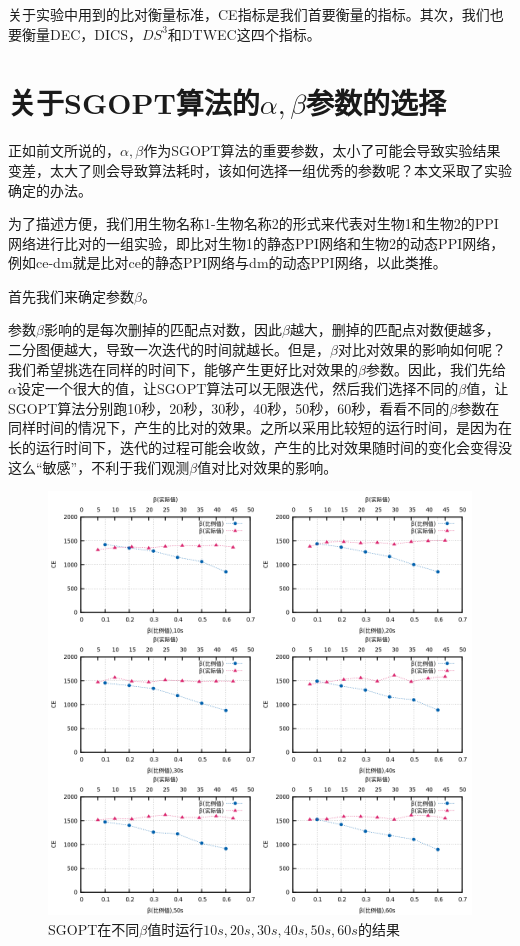 关于实验中用到的比对衡量标准，CE指标是我们首要衡量的指标。其次，我们也要衡量DEC，DICS，$DS^3$和DTWEC这四个指标。

\section{关于SGOPT算法的$\alpha,\beta$参数的选择}

正如前文所说的，$\alpha,\beta$作为SGOPT算法的重要参数，太小了可能会导致实验结果变差，太大了则会导致算法耗时，该如何选择一组优秀的参数呢？本文采取了实验确定的办法。

为了描述方便，我们用生物名称1-生物名称2的形式来代表对生物1和生物2的PPI网络进行比对的一组实验，即比对生物1的静态PPI网络和生物2的动态PPI网络，例如ce-dm就是比对ce的静态PPI网络与dm的动态PPI网络，以此类推。

首先我们来确定参数$\beta$。

参数$\beta$影响的是每次删掉的匹配点对数，因此$\beta$越大，删掉的匹配点对数便越多，二分图便越大，导致一次迭代的时间就越长。但是，$\beta$对比对效果的影响如何呢？我们希望挑选在同样的时间下，能够产生更好比对效果的$\beta$参数。因此，我们先给$\alpha$设定一个很大的值，让SGOPT算法可以无限迭代，然后我们选择不同的$\beta$值，让SGOPT算法分别跑10秒，20秒，30秒，40秒，50秒，60秒，看看不同的$\beta$参数在同样时间的情况下，产生的比对的效果。之所以采用比较短的运行时间，是因为在长的运行时间下，迭代的过程可能会收敛，产生的比对效果随时间的变化会变得没这么“敏感”，不利于我们观测$\beta$值对比对效果的影响。
\begin{figure}[htbp]
\centering
\includegraphics[width=\textwidth]{pic/beta.png}
\caption{SGOPT在不同$\beta$值时运行$10s,20s,30s,40s,50s,60s$的结果} 
\label{fig:beta}
\end{figure}

